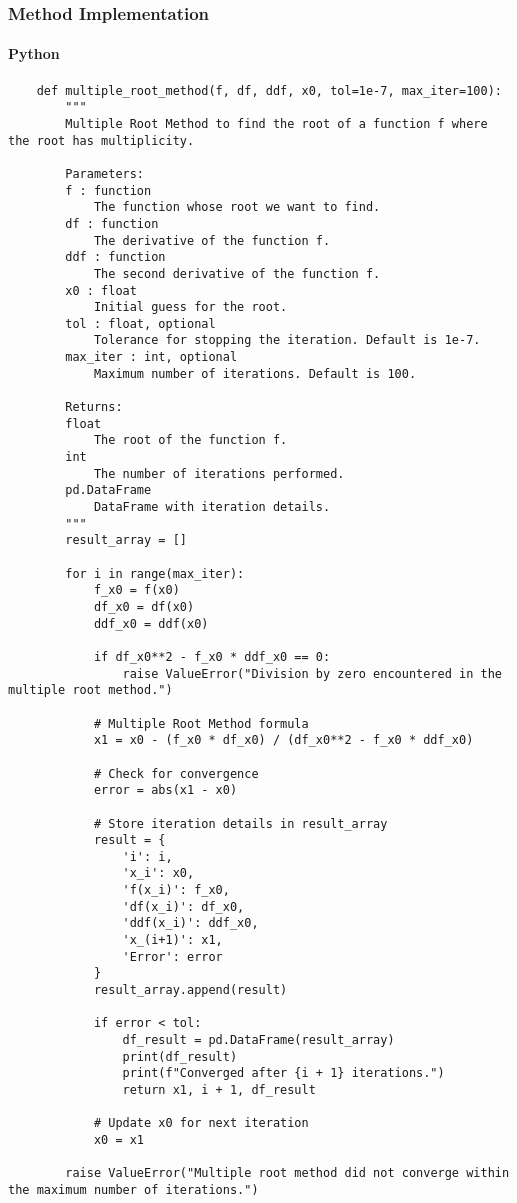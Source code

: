 \documentclass{article}
\begin{document}
        \subsubsection{Method Implementation}
            \paragraph{Python}
                \begin{verbatim}
    def multiple_root_method(f, df, ddf, x0, tol=1e-7, max_iter=100):
        """
        Multiple Root Method to find the root of a function f where the root has multiplicity.

        Parameters:
        f : function
            The function whose root we want to find.
        df : function
            The derivative of the function f.
        ddf : function
            The second derivative of the function f.
        x0 : float
            Initial guess for the root.
        tol : float, optional
            Tolerance for stopping the iteration. Default is 1e-7.
        max_iter : int, optional
            Maximum number of iterations. Default is 100.

        Returns:
        float
            The root of the function f.
        int
            The number of iterations performed.
        pd.DataFrame
            DataFrame with iteration details.
        """
        result_array = []

        for i in range(max_iter):
            f_x0 = f(x0)
            df_x0 = df(x0)
            ddf_x0 = ddf(x0)

            if df_x0**2 - f_x0 * ddf_x0 == 0:
                raise ValueError("Division by zero encountered in the multiple root method.")

            # Multiple Root Method formula
            x1 = x0 - (f_x0 * df_x0) / (df_x0**2 - f_x0 * ddf_x0)

            # Check for convergence
            error = abs(x1 - x0)

            # Store iteration details in result_array
            result = {
                'i': i,
                'x_i': x0,
                'f(x_i)': f_x0,
                'df(x_i)': df_x0,
                'ddf(x_i)': ddf_x0,
                'x_(i+1)': x1,
                'Error': error
            }
            result_array.append(result)

            if error < tol:
                df_result = pd.DataFrame(result_array)
                print(df_result)
                print(f"Converged after {i + 1} iterations.")
                return x1, i + 1, df_result

            # Update x0 for next iteration
            x0 = x1

        raise ValueError("Multiple root method did not converge within the maximum number of iterations.")
                \end{verbatim}
\end{document}
